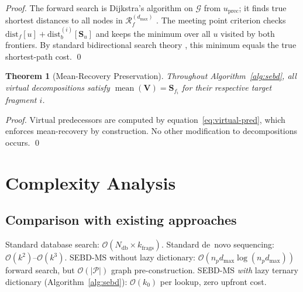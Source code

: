 \documentclass[twocolumn,10pt,a4paper]{article}
\theoremstyle{thmstyle}
\newtheorem{theorem}{Theorem}[section]
\theoremstyle{definition}
\theoremstyle{remark}
\newcommand{\Parts}{\mathcal{P}}
\newcommand{\Sv}{\mathbf{S}}
\newcommand{\calG}{\mathcal{G}}
\newcommand{\Reachf}{\mathcal{R}_f}
\DeclareMathOperator{\mean}{mean}
\begin{document}
\begin{proof}
The forward search is Dijkstra's algorithm on $\calG$ from
$u_\text{prec}$; it finds true shortest distances to all nodes in
$\Reachf^{(d_\text{max})}$ \citep{dijkstra1959}. The meeting point
criterion checks $\text{dist}_f[u] + \text{dist}_b^{(i)}[\Sv_u]$
and keeps the minimum over all $u$ visited by both frontiers.
By standard bidirectional search theory \citep{pohl1969,kaindl1997},
this minimum equals the true shortest-path cost. \qed
\end{proof}

\begin{theorem}[Mean-Recovery Preservation]
\label{thm:mean-recovery}
Throughout Algorithm~\ref{alg:sebd}, all virtual decompositions satisfy
$\mean(\mathbf{V}) = \Sv_{f_i}$ for their respective target fragment $i$.
\end{theorem}

\begin{proof}
Virtual predecessors are computed by equation~\eqref{eq:virtual-pred},
which enforces mean-recovery by construction. No other modification
to decompositions occurs. \qed
\end{proof}

\section{Complexity Analysis}
\label{sec:complexity}

\subsection{Comparison with existing approaches}

Standard database search: $\mathcal{O}(N_\text{db} \times k_\text{frags})$.
Standard de~novo sequencing: $\mathcal{O}(k^2)$--$\mathcal{O}(k^3)$.
SEBD-MS without lazy dictionary: $\mathcal{O}(n_p d_\text{max} \log(n_p d_\text{max}))$
forward search, but $\mathcal{O}(|\Parts|)$ graph pre-construction.
SEBD-MS \emph{with} lazy ternary dictionary (Algorithm~\ref{alg:sebd}):
$\mathcal{O}(k_0)$ per lookup, zero upfront cost.
\end{document}
